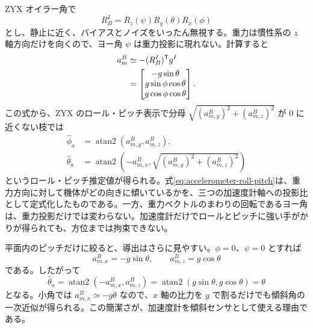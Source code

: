 ZYX オイラー角で
\begin{equation}
  R^I_B=R_z(\psi)R_y(\theta)R_x(\phi)
\end{equation}
とし、静止に近く、バイアスとノイズをいったん無視する。重力は慣性系の $z$ 軸方向だけを向くので、ヨー角 $\psi$ は重力投影に現れない。計算すると
\begin{align}
  a_m^B
  &\simeq
  - (R^I_B)^{\mathsf{T}} g^I\\
  &=
  \begin{bmatrix}
    -g\sin\theta\\
    g\sin\phi\cos\theta\\
    g\cos\phi\cos\theta
  \end{bmatrix}.
  \label{eq:accelerometer-gravity-projection}
\end{align}
この式から、ZYX のロール・ピッチ表示で分母 $\sqrt{(a_{m,y}^B)^2+(a_{m,z}^B)^2}$ が 0 に近くない枝では
\begin{align}
  \hat{\phi}_a
  &=
  \operatorname{atan2}\left(a_{m,y}^B,a_{m,z}^B\right),\\
  \hat{\theta}_a
  &=
  \operatorname{atan2}\left(-a_{m,x}^B,
    \sqrt{(a_{m,y}^B)^2+(a_{m,z}^B)^2}\right)
  \label{eq:accelerometer-roll-pitch}
\end{align}
というロール・ピッチ推定値が得られる。式\eqref{eq:accelerometer-roll-pitch}は、重力方向に対して機体がどの向きに傾いているかを、三つの加速度計軸への投影比として定式化したものである。一方、重力ベクトルのまわりの回転であるヨー角は、重力投影だけでは変わらない。加速度計だけでロールとピッチに強い手がかりが得られても、方位までは拘束できない。

平面内のピッチだけに絞ると、導出はさらに見やすい。$\phi=0$、$\psi=0$ とすれば
\begin{equation}
  a_{m,x}^B=-g\sin\theta,\qquad
  a_{m,z}^B=g\cos\theta
\end{equation}
である。したがって
\begin{equation}
  \hat{\theta}_a
  =
  \operatorname{atan2}\left(-a_{m,x}^B,a_{m,z}^B\right)
  =
  \operatorname{atan2}\left(g\sin\theta,g\cos\theta\right)
  =
  \theta
\end{equation}
となる。小角では $a_{m,x}^B\simeq -g\theta$ なので、$x$ 軸の比力を $g$ で割るだけでも傾斜角の一次近似が得られる。この簡潔さが、加速度計を傾斜センサとして使える理由である。

